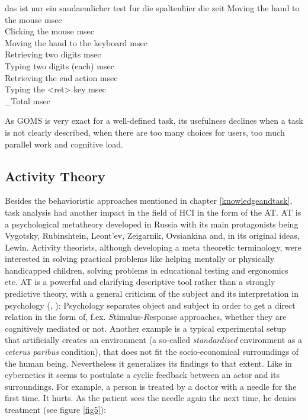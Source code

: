 \begin{tabbing}
das ist nur ein saudaemlicher test fur die spalten\=  hier die zeit\kill
Moving the hand to the mouse  msec\\
Clicking the mouse  msec\\
Moving the hand to the keyboard  msec\\
Retrieving two digits  msec\\
Typing two digits (each) msec\\
Retrieving the end action  msec\\
Typing the <ret> key  msec\\
\_Total  msec
\end{tabbing}

As \ac{GOMS} is very exact for a well-defined task, its usefulness declines when a task is not clearly described, when there are too many choices for users, too much parallel work and cognitive load. 

\subsection{Activity Theory}
Besides the behavioristic approaches mentioned in chapter \ref{knowledgeandtask}, task analysis had another impact in the field of \ac{HCI} in the form of the \ac{AT}. \acs{AT} is a psychological metatheory developed in Russia with its main protagonists being Vygotsky, Rubinshtein, Leont'ev, Zeigarnik, Ovsiankina  and, in its original ideas, Lewin. Activity theorists, although developing a meta theoretic terminology, were interested in solving practical problems like helping mentally or physically handicapped children, solving problems in educational testing and ergonomics etc. \ac{AT} is a powerful and clarifying descriptive tool rather than a strongly predictive theory, with a general criticism of the subject and its interpretation in psychology (\cite{nardi1996activity}, \cite{leont1974problem}): Psychology separates object and subject in order to get a direct relation in the form of, f.ex. $S$timulus-$R$esponse approaches, whether they are cognitively mediated or not. Another example is a typical experimental setup that artificially creates an environment (a so-called \textit{standardized} environment as a \textit{ceterus paribus} condition), that does not fit the socio-economical surroundings of the human being. Nevertheless it generalizes its findings to that extent. Like in cybernetics it seems to postulate a cyclic feedback between an actor and its surroundings. For example, a person is treated by a doctor with a needle for the first time. It hurts. As the patient sees the needle again the next time, he denies treatment (see figure \ref{fig5}): 

